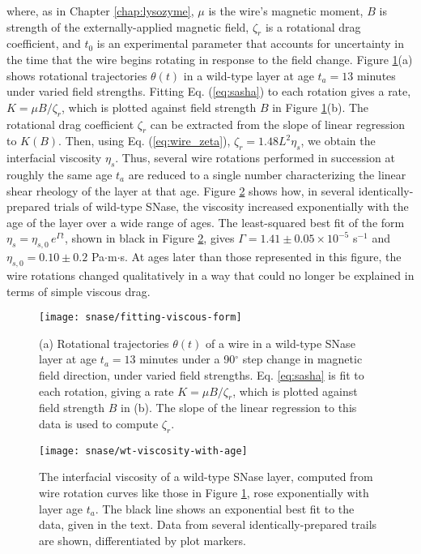 \noindent where, as in Chapter \ref{chap:lysozyme}, $\mu$ is the wire's magnetic moment, $B$ is strength of the externally-applied magnetic field, $\zeta_r$ is a rotational drag coefficient, and $t_0$ is an experimental parameter that accounts for uncertainty in the time that the wire begins rotating in response to the field change. Figure \ref{fig:fitting-viscous-form}(a) shows rotational trajectories $\theta(t)$ in a wild-type layer at age $t_a=13$ minutes under varied field strengths. Fitting Eq. (\ref{eq:sasha}) to each rotation gives a rate, $K=\mu B/\zeta_r$, which is plotted against field strength $B$ in Figure \ref{fig:fitting-viscous-form}(b). The rotational drag coefficient $\zeta_r$ can be extracted from the slope of linear regression to $K(B)$. Then, using Eq. (\ref{eq:wire_zeta}), $\zeta_r = 1.48 L^2\eta_s$, we obtain the interfacial viscosity $\eta_s$. Thus, several wire rotations performed in succession at roughly the same age $t_a$ are reduced to a single number characterizing the linear shear rheology of the layer at that age. Figure \ref{fig:wt-viscosity-with-age} shows how, in several identically-prepared trials of wild-type SNase, the viscosity increased exponentially with the age of the layer over a wide range of ages. The least-squared best fit of the form $\eta_s=\eta_{s,0}\, e^{\Gamma t}$, shown in black in Figure \ref{fig:wt-viscosity-with-age}, gives $\Gamma=1.41 \pm 0.05 \times 10^{-5}$ s$^{-1}$ and $\eta_{s,0}=0.10 \pm 0.2$ \textmu Pa$\cdot$m$\cdot$s. At ages later than those represented in this figure, the wire rotations changed qualitatively in a way that could no longer be explained in terms of simple viscous drag.

   \begin{figure}
    \centering
    \texttt{[image: snase/fitting-viscous-form]} %
    \caption{\label{fig:fitting-viscous-form}(a) Rotational trajectories $\theta(t)$ of a wire in a wild-type SNase layer at age $t_a=13$ minutes under a 90$^\circ$ step change in magnetic field direction, under varied field strengths. Eq. \ref{eq:sasha} is fit to each rotation, giving a rate $K=\mu B/\zeta_r$, which is plotted against field strength $B$ in (b). The slope of the linear regression to this data is used to compute $\zeta_r$.}
    \end{figure}

   \begin{figure}
    \centering
    \texttt{[image: snase/wt-viscosity-with-age]}
    \caption{\label{fig:wt-viscosity-with-age}The interfacial viscosity of a wild-type SNase layer, computed from wire rotation curves like those in Figure \ref{fig:fitting-viscous-form}, rose exponentially with layer age $t_a$. The black line shows an exponential best fit to the data, given in the text. Data from several identically-prepared trails are shown, differentiated by plot markers.}
    \end{figure}
   

